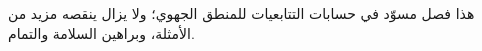 \documentclass[../../../include/open-logic-chapter]{subfiles}
\begin{document}
\begin{editorial}
  هذا فصل مسوّد في حسابات التتابعيات للمنطق الجهوي؛ ولا يزال ينقصه
  مزيد من الأمثلة، وبراهين السلامة والتمام.
\end{editorial}


\OLEndChapterHook
\end{document}
